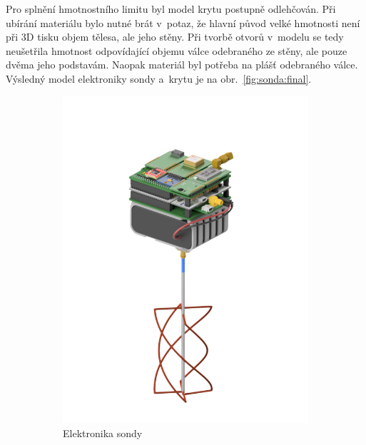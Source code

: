\documentclass[twoside]{ctuthesis}
\theoremstyle{plain}
\theoremstyle{definition}
\theoremstyle{note}
\begin{document}
	Pro splnění hmotnostního limitu byl model krytu postupně odlehčován. Při ubírání materiálu bylo nutné brát v~potaz, že hlavní původ velké hmotnosti není při 3D tisku objem tělesa, ale jeho stěny. Při tvorbě otvorů v~modelu se tedy neušetřila hmotnost odpovídající objemu válce odebraného ze stěny, ale pouze dvěma jeho podstavám. Naopak materiál byl potřeba na plášť odebraného válce. Výsledný model elektroniky sondy a~krytu je na obr.~\ref{fig:sonda:final}.
	\begin{figure}[hbtp]
		\centering
		\begin{subfigure}{.49\textwidth}
			\centering
			\includegraphics[width = .85\textwidth]{Figures/sonda_no_case.png}
			\caption{Elektronika sondy}
			\label{fig:sonda:no:case}
		\end{subfigure}
		\begin{subfigure}{.49\textwidth}
			\centering

\end{subfigure}
\end{figure}
\end{document}

